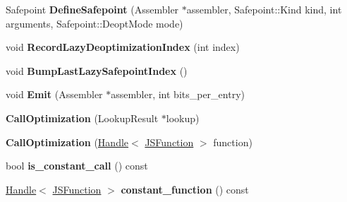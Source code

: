 \begin{DoxyCompactItemize}
\item 
\hypertarget{classv8_1_1internal_1_1_b_a_s_e___e_m_b_e_d_d_e_d_a199371fa9064d8f14e54e867fc290939}{}Safepoint {\bfseries Define\+Safepoint} (Assembler $\ast$assembler, Safepoint\+::\+Kind kind, int arguments, Safepoint\+::\+Deopt\+Mode mode)\label{classv8_1_1internal_1_1_b_a_s_e___e_m_b_e_d_d_e_d_a199371fa9064d8f14e54e867fc290939}

\item 
\hypertarget{classv8_1_1internal_1_1_b_a_s_e___e_m_b_e_d_d_e_d_aef6efd1d0a77a9088027c9235d65779d}{}void {\bfseries Record\+Lazy\+Deoptimization\+Index} (int index)\label{classv8_1_1internal_1_1_b_a_s_e___e_m_b_e_d_d_e_d_aef6efd1d0a77a9088027c9235d65779d}

\item 
\hypertarget{classv8_1_1internal_1_1_b_a_s_e___e_m_b_e_d_d_e_d_a894dab836a0969768cea255f5390750c}{}void {\bfseries Bump\+Last\+Lazy\+Safepoint\+Index} ()\label{classv8_1_1internal_1_1_b_a_s_e___e_m_b_e_d_d_e_d_a894dab836a0969768cea255f5390750c}

\item 
\hypertarget{classv8_1_1internal_1_1_b_a_s_e___e_m_b_e_d_d_e_d_afbf37e9fb9ff18332aab8cc3db3b98c3}{}void {\bfseries Emit} (Assembler $\ast$assembler, int bits\+\_\+per\+\_\+entry)\label{classv8_1_1internal_1_1_b_a_s_e___e_m_b_e_d_d_e_d_afbf37e9fb9ff18332aab8cc3db3b98c3}

\item 
\hypertarget{classv8_1_1internal_1_1_b_a_s_e___e_m_b_e_d_d_e_d_a25bc06003dbd22fe07b0d04d88474ca1}{}{\bfseries Call\+Optimization} (Lookup\+Result $\ast$lookup)\label{classv8_1_1internal_1_1_b_a_s_e___e_m_b_e_d_d_e_d_a25bc06003dbd22fe07b0d04d88474ca1}

\item 
\hypertarget{classv8_1_1internal_1_1_b_a_s_e___e_m_b_e_d_d_e_d_a1342c73eadec0b2272ab1360e8be1cc6}{}{\bfseries Call\+Optimization} (\hyperlink{classv8_1_1internal_1_1_handle}{Handle}$<$ \hyperlink{classv8_1_1internal_1_1_j_s_function}{J\+S\+Function} $>$ function)\label{classv8_1_1internal_1_1_b_a_s_e___e_m_b_e_d_d_e_d_a1342c73eadec0b2272ab1360e8be1cc6}

\item 
\hypertarget{classv8_1_1internal_1_1_b_a_s_e___e_m_b_e_d_d_e_d_a30c692f0c433d068f5af11c5133a3c34}{}bool {\bfseries is\+\_\+constant\+\_\+call} () const \label{classv8_1_1internal_1_1_b_a_s_e___e_m_b_e_d_d_e_d_a30c692f0c433d068f5af11c5133a3c34}

\item 
\hypertarget{classv8_1_1internal_1_1_b_a_s_e___e_m_b_e_d_d_e_d_abd8fe7a6b8e53dea4df8d5ff52a94e25}{}\hyperlink{classv8_1_1internal_1_1_handle}{Handle}$<$ \hyperlink{classv8_1_1internal_1_1_j_s_function}{J\+S\+Function} $>$ {\bfseries constant\+\_\+function} () const \label{classv8_1_1internal_1_1_b_a_s_e___e_m_b_e_d_d_e_d_abd8fe7a6b8e53dea4df8d5ff52a94e25}


\end{DoxyCompactItemize}
